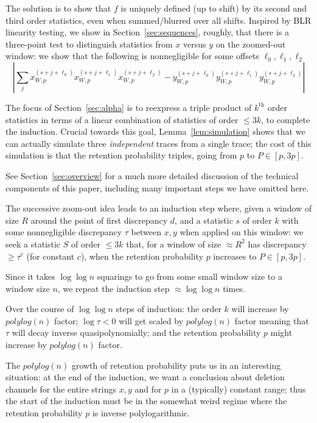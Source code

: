 \documentclass[11pt]{article}
\theoremstyle{plain}
\begin{document}
The solution is to show that $f$ is uniquely defined (up to shift) by its second and third order statistics, even when summed/blurred over all shifts. Inspired by BLR linearity testing, we show in Section~\ref{sec:sequences}, roughly, that there is a three-point test to distinguish statistics from $x$ versus $y$ on the zoomed-out window: we show that the following is nonnegligible for some offsets $\ell_0,\ell_1,\ell_2$ \[\left|\sum_j x_{W,p}^{(s+j+\ell_0)}x_{W,p}^{(s+j+\ell_1)}x_{W,p}^{(s+j+\ell_2)}-y_{W,p}^{(s+j+\ell_0)}y_{W,p}^{(s+j+\ell_1)}y_{W,p}^{(s+j+\ell_2)}\right|\]

The focus of Section~\ref{sec:alpha} is to reexpress a triple product of $k^{\textrm{th}}$ order statistics in terms of a linear combination of statistics of order $\leq 3k$, to complete the induction. Crucial towards this goal, Lemma~\ref{lem:simulation} shows that we can actually simulate three \emph{independent} traces from a single trace; the cost of this simulation is that the retention probability triples, going from $p$ to $P\in[p,3p]$.

See Section~\ref{sec:overview} for a much more detailed discussion of the technical components of this paper, including many important steps we have omitted here.

\medskip{}

The successive zoom-out idea leads to an induction step where, given a window of size $R$ around the point of first discrepancy $d$, and a statistic $s$ of order $k$ with some nonnegligible discrepancy $\tau$ between $x,y$ when applied on this window: we seek a statistic $S$ of order $\leq 3k$ that, for a window of size $\approx R^2$ has discrepancy $\geq \tau^c$ (for constant $c$), when the retention probability $p$ increases to $P\in[p,3p]$.

Since it takes $\log\log n$ squarings to go from some small window size to a window size $n$, we repeat the induction step $\approx\log\log n$ times. 

Over the course of $\log\log n$ steps of induction: the order $k$ will increase by $polylog(n)$ factor; $\log\tau<0$ will get scaled by $polylog(n)$ factor meaning that $\tau$ will decay inverse quasipolynomially; and the retention probability $p$ might increase by $polylog(n)$ factor.

The $polylog(n)$ growth of retention probability puts us in an interesting situation: at the end of the induction, we want a conclusion about deletion channels for the entire strings $x,y$ and for $p$ in a (typically) constant range; thus the start of the induction must be in the somewhat weird regime where the retention probability $p$ is inverse polylogarithmic.
\end{document}
